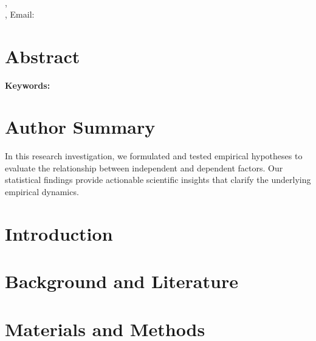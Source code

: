 \documentclass[10pt,letterpaper]{article}
\begin{document}
\vspace*{0.2in}

\begin{flushleft}
{\Large
\textbf{}
}
\newline
\\
\textbf{}\textsuperscript{}, 
\\
\bigskip
{}
\textbf{} , Email: \\
\end{flushleft}

\section*{Abstract}

\bigskip
\noindent\textbf{Keywords:} 

\section*{Author Summary}
In this research investigation, we formulated and tested empirical hypotheses to evaluate the relationship between independent and dependent factors. Our statistical findings provide actionable scientific insights that clarify the underlying empirical dynamics.

\section*{Introduction}

\section*{Background and Literature}

\section*{Materials and Methods}
\end{document}
